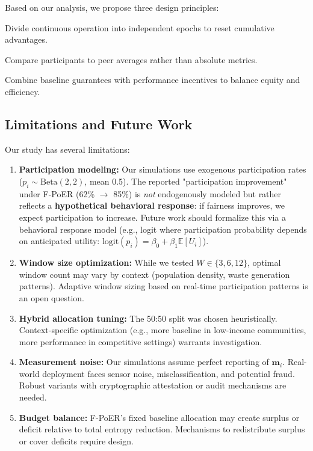 \documentclass[12pt,a4paper]{article}
\begin{document}
Based on our analysis, we propose three design principles:

\begin{principle}
Divide continuous operation into independent epochs to reset cumulative advantages.
\end{principle}

\begin{principle}
Compare participants to peer averages rather than absolute metrics.
\end{principle}

\begin{principle}
Combine baseline guarantees with performance incentives to balance equity and efficiency.
\end{principle}

\subsection{Limitations and Future Work}

Our study has several limitations:

\begin{enumerate}
    \item \textbf{Participation modeling:} Our simulations use exogenous participation rates ($p_i \sim \text{Beta}(2,2)$, mean 0.5). The reported "participation improvement" under F-PoER (62\% $\rightarrow$ 85\%) is \textit{not} endogenously modeled but rather reflects a \textbf{hypothetical behavioral response}: if fairness improves, we expect participation to increase. Future work should formalize this via a behavioral response model (e.g., logit where participation probability depends on anticipated utility: $\text{logit}(p_i) = \beta_0 + \beta_1 \mathbb{E}[U_i]$).
    
    \item \textbf{Window size optimization:} While we tested $W \in \{3, 6, 12\}$, optimal window count may vary by context (population density, waste generation patterns). Adaptive window sizing based on real-time participation patterns is an open question.
    
    \item \textbf{Hybrid allocation tuning:} The 50:50 split was chosen heuristically. Context-specific optimization (e.g., more baseline in low-income communities, more performance in competitive settings) warrants investigation.
    
    \item \textbf{Measurement noise:} Our simulations assume perfect reporting of $\mathbf{m}_i$. Real-world deployment faces sensor noise, misclassification, and potential fraud. Robust variants with cryptographic attestation or audit mechanisms are needed.
    
    \item \textbf{Budget balance:} F-PoER's fixed baseline allocation may create surplus or deficit relative to total entropy reduction. Mechanisms to redistribute surplus or cover deficits require design.
\end{enumerate}
\end{document}

